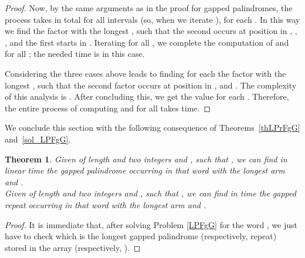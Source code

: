 \documentclass[final]{dmtcs-episciences}
\newtheorem{theorem}{Theorem}
\begin{document}
\begin{proof}
Now, by the same arguments as in the proof for gapped palindromes, the process takes  in total for all intervals  (so, when we iterate ), for each . In this way we find the factor  with the longest , such that the second  occurs at position  in , , , and the first  starts in . Iterating for all , we complete the computation of  and  for all ; the needed time is  in this case.

Considering the three cases above leads to finding for each  the factor  with the longest , such that the second  factor occurs at position  in ,  and . The complexity of this analysis is . After concluding this, we get the value  for each . Therefore, the entire process of computing  and  for all  takes  time.
\end{proof}

We conclude this section with the following consequence of Theorems~\ref{thLPrFgG} and~\ref{sol_LPFgG}.

\begin{theorem}
Given  of length  and two integers  and , such that , we can find in linear time the gapped palindrome  occurring in that word with the longest arm  and .\\
Given  of length  and two integers  and , such that , we can find in  time the gapped repeat  occurring in that word with the longest arm  and .
\end{theorem}
\begin{proof}
It is immediate that, after solving Problem \ref{LPFgG} for the word , we just have to check which is the longest gapped palindrome (respectively, repeat) stored in the array  (respectively, ). 
 \end{proof}
\end{document}
